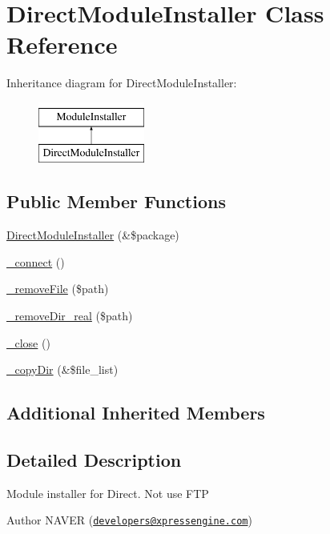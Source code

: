 \hypertarget{classDirectModuleInstaller}{}\section{Direct\+Module\+Installer Class Reference}
\label{classDirectModuleInstaller}
Inheritance diagram for Direct\+Module\+Installer\+:\begin{figure}[H]
\begin{center}
\leavevmode
\includegraphics[height=2.000000cm]{classDirectModuleInstaller}
\end{center}
\end{figure}
\subsection*{Public Member Functions}
\begin{DoxyCompactItemize}
\item 
\hyperlink{classDirectModuleInstaller_a713e0cebd57a87f357d05d06445508f1}{Direct\+Module\+Installer} (\&\$package)
\item 
\hyperlink{classDirectModuleInstaller_a8131092380fdf3c78082de11f4c83f70}{\+\_\+connect} ()
\item 
\hyperlink{classDirectModuleInstaller_a6fb855a965f6b16e450b4c97f2a79ca2}{\+\_\+remove\+File} (\$path)
\item 
\hyperlink{classDirectModuleInstaller_aec81874ceba294e9a63ad515c2a15c87}{\+\_\+remove\+Dir\+\_\+real} (\$path)
\item 
\hyperlink{classDirectModuleInstaller_acda2b7c05a32c6f9641fc24c2e3e6962}{\+\_\+close} ()
\item 
\hyperlink{classDirectModuleInstaller_acc70fcfb029792d83a577fbbebfcb918}{\+\_\+copy\+Dir} (\&\$file\+\_\+list)
\end{DoxyCompactItemize}
\subsection*{Additional Inherited Members}


\subsection{Detailed Description}
Module installer for Direct. Not use F\+TP \begin{DoxyAuthor}{Author}
N\+A\+V\+ER (\href{mailto:developers@xpressengine.com}{\tt developers@xpressengine.\+com}) 
\end{DoxyAuthor}



